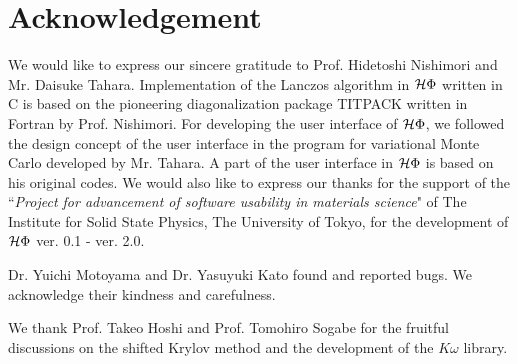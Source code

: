 \chapter{Acknowledgement}
We would like to express our sincere gratitude to Prof. Hidetoshi Nishimori and Mr. Daisuke Tahara.
Implementation of the Lanczos algorithm in $\mathcal{H} \Phi$ written in C is based on the
pioneering diagonalization package TITPACK written in Fortran by Prof. Nishimori.
For developing the user interface of $\mathcal{H} \Phi$, we followed the design concept of
the user interface in the program for variational Monte Carlo developed by Mr. Tahara.
A part of the user interface in $\mathcal{H} \Phi$ is based on his original codes.
We would also like to express our thanks for the support of the ``{\it Project for advancement of software usability in materials science}" 
of The Institute for Solid State Physics, The University of Tokyo, for the development of $\mathcal{H} \Phi$ ver. 0.1 - ver. 2.0.

Dr. Yuichi Motoyama and Dr. Yasuyuki Kato found and reported bugs.
We acknowledge their kindness and carefulness.

We thank Prof. Takeo Hoshi and Prof. Tomohiro Sogabe for the fruitful discussions on the shifted Krylov method and the development of the $K\omega$ library.


